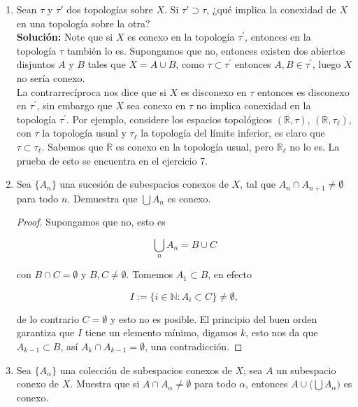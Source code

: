 \documentclass[12bpt]{article}
\begin{document}
\begin{enumerate}
    \item Sean $\tau$ y $\tau'$ dos topologías sobre $X$. Si $\tau' \supset \tau$, ¿qué implica la conexidad de $X$ en una topología sobre la otra?\\

    \textbf{Solución:} Note que si $X$ es conexo en la topología $\tau^{\prime}$, entonces en la topología $\tau$ también lo es. Supongamos que no, entonces existen dos abiertos disjuntos $A$ y $B$ tales que $X=A\cup B$, como $\tau\subset \tau^{\prime}$ entonces $A,B\in \tau^{\prime}$, luego $X$ no sería conexo.\\

    La contrarrecíproca nos dice que si $X$ es disconexo en $\tau$ entonces es disconexo en $\tau^{\prime}$, sin embargo que $X$ sea conexo en $\tau$ no implica conexidad  en la topología $\tau^{\prime}$. Por ejemplo, considere los espacios topológicos $(\mathbb{R},\tau)$, $(\mathbb{R},\tau_{\ell})$, con $\tau$ la topología usual y $\tau_{\ell}$ la topología del límite inferior, es claro que $\tau\subset \tau_{\ell}$. Sabemos que $\mathbb{R}$ es conexo en la topología usual, pero $\mathbb{R}_{\ell}$ no lo es. La prueba de esto se encuentra en el ejercicio 7.
    
    \item Sea $\{A_n\}$ una sucesión de subespacios conexos de $X$, tal que $A_n \cap A_{n+1} \neq \emptyset$ para todo $n$. Demuestra que $\bigcup A_n$ es conexo.

    \begin{proof}
        Supongamos que no, esto es

        $$\bigcup_{n}A_n=B\cup C 
            $$

        con $B\cap C=\emptyset$ y $B,C\neq \emptyset$. Tomemos $A_1\subset B$, en efecto
        
        $$I:=\{ i\in\mathbb{N}: A_i\subset C\}\neq \emptyset,$$

        de lo contrario $C=\emptyset$ y esto no es posible. El principio del buen orden garantiza que $I$ tiene un elemento mínimo, digamos $k$, esto nos da que $A_{k-1}\subset B$, así $A_k\cap A_{k-1}=\emptyset$, una contradicción. 
    \end{proof}
    
    \item Sea $\{A_\alpha\}$ una colección de subespacios conexos de $X$; sea $A$ un subespacio conexo de $X$. Muestra que si $A \cap A_\alpha \neq \emptyset$ para todo $\alpha$, entonces $A \cup \big(\bigcup A_\alpha\big)$ es conexo.


\end{enumerate}
\end{document}

